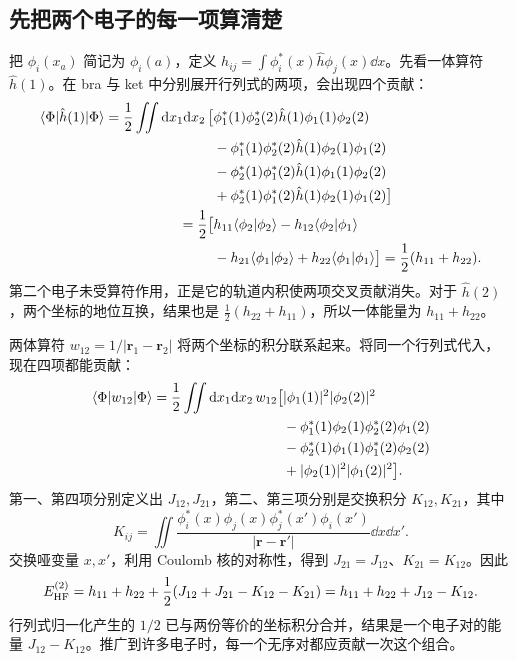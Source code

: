 \subsection{先把两个电子的每一项算清楚}
把 $\phi_i(x_a)$ 简记为 $\phi_i(a)$，定义 $h_{ij}=\int\phi_i^*(x)\hat h\phi_j(x)\dd x$。先看一体算符 $\hat h(1)$。在 bra 与 ket 中分别展开行列式的两项，会出现四个贡献：
\begin{align}
\langle\Phi|\hat h(1)|\Phi\rangle
=\frac12\iint\mathrm{d} x_1\mathrm{d} x_2\,\bigl[&
\phi_1^*(1)\phi_2^*(2)\hat h(1)\phi_1(1)\phi_2(2)\notag\\
&-\phi_1^*(1)\phi_2^*(2)\hat h(1)\phi_2(1)\phi_1(2)\notag\\
&-\phi_2^*(1)\phi_1^*(2)\hat h(1)\phi_1(1)\phi_2(2)\notag\\
&+\phi_2^*(1)\phi_1^*(2)\hat h(1)\phi_2(1)\phi_1(2)\bigr]\notag\\
=\frac12\bigl[&h_{11}\langle\phi_2|\phi_2\rangle
-h_{12}\langle\phi_2|\phi_1\rangle\notag\\
&-h_{21}\langle\phi_1|\phi_2\rangle
+h_{22}\langle\phi_1|\phi_1\rangle\bigr]
=\frac12(h_{11}+h_{22}).
\end{align}
第二个电子未受算符作用，正是它的轨道内积使两项交叉贡献消失。对于 $\hat h(2)$，两个坐标的地位互换，结果也是 $\tfrac12(h_{22}+h_{11})$，所以一体能量为 $h_{11}+h_{22}$。

两体算符 $w_{12}=1/|\bm r_1-\bm r_2|$ 将两个坐标的积分联系起来。将同一个行列式代入，现在四项都能贡献：
\begin{align}
\langle\Phi|w_{12}|\Phi\rangle
=\frac12\iint\mathrm{d} x_1\mathrm{d} x_2\,w_{12}\bigl[&
|\phi_1(1)|^2|\phi_2(2)|^2\notag\\
&-\phi_1^*(1)\phi_2(1)\phi_2^*(2)\phi_1(2)\notag\\
&-\phi_2^*(1)\phi_1(1)\phi_1^*(2)\phi_2(2)\notag\\
&+|\phi_2(1)|^2|\phi_1(2)|^2\bigr].
\end{align}
第一、第四项分别定义出 $J_{12},J_{21}$，第二、第三项分别是交换积分 $K_{12},K_{21}$，其中
\begin{equation}
K_{ij}=\iint\frac{\phi_i^*(x)\phi_j(x)\phi_j^*(x')\phi_i(x')}{|\bm r-\bm r'|}\dd x\dd x'.
\end{equation}
交换哑变量 $x,x'$，利用 Coulomb 核的对称性，得到 $J_{21}=J_{12}$、$K_{21}=K_{12}$。因此
\begin{equation}\label{hf:two-electron-energy}
E_{\rm HF}^{(2)}=h_{11}+h_{22}
+\frac12(J_{12}+J_{21}-K_{12}-K_{21})
=h_{11}+h_{22}+J_{12}-K_{12}.
\end{equation}
行列式归一化产生的 $1/2$ 已与两份等价的坐标积分合并，结果是一个电子对的能量 $J_{12}-K_{12}$。推广到许多电子时，每一个无序对都应贡献一次这个组合。

